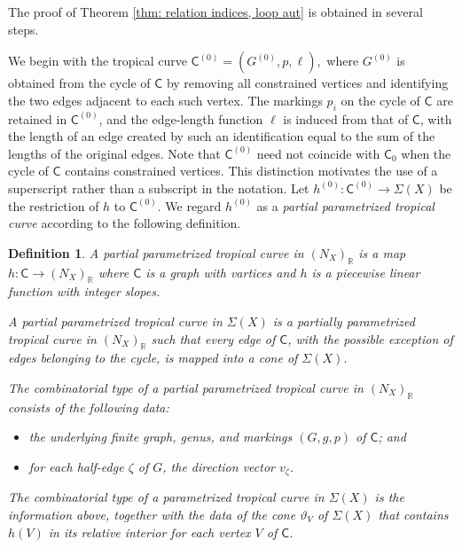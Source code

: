 \documentclass{article}
\newtheorem{definition}{Definition}[section]
\newcommand{\tropC}{\mathsf{C}}
\begin{document}
The proof of Theorem \ref{thm: relation indices, loop aut} is obtained in several steps. 

We begin with the tropical curve
$
\tropC^{(0)}=(G^{(0)},p,\ell),
$
where $G^{(0)}$ is obtained from the cycle of $\mathsf{C}$ by removing all constrained vertices and identifying the two edges adjacent to each such vertex. The markings $p_i$ on the cycle of $\mathsf{C}$ are retained in $\tropC^{(0)}$, and the edge-length function $\ell$ is induced from that of $\mathsf{C}$, with the length of an edge created by such an identification equal to the sum of the lengths of the original edges. Note that $\tropC^{(0)}$ need not coincide with $\tropC_0$ when the cycle of $\tropC$ contains constrained vertices. This distinction motivates the use of a superscript rather than a subscript in the notation. Let $h^{(0)}: \tropC^{(0)} \to \Sigma(X)$ be the restriction of $h$ to $\tropC^{(0)}$. We regard $h^{(0)}$ as a \emph{partial parametrized tropical curve} according to the following definition.

\begin{definition}
    A partial parametrized tropical curve in $(N_X)_{\mathbb{R}}$ is a map $h: \tropC \to (N_X)_\mathbb{R}$ where $\tropC$ is a graph with vartices and $h$ is a piecewise linear function with integer slopes. 

    A partial parametrized tropical curve in $\Sigma(X)$ is a partially parametrized tropical curve in $(N_X)_{\mathbb{R}}$ such that every edge of $\tropC$, with the possible exception of edges belonging to the cycle, is mapped into a cone of $\Sigma(X)$.

    The combinatorial type of a partial parametrized tropical curve in $(N_X)_{\mathbb{R}}$ consists of the following data: 
    \begin{itemize}
        \item the underlying finite graph, genus, and markings $(G,g,p)$ of $\tropC$; and
        \item for each half-edge $\zeta$ of $G$, the direction vector $v_{\zeta}$. 
    \end{itemize}

    The combinatorial type of a parametrized tropical curve in $\Sigma(X)$ is the information above, together with the data of the cone $\vartheta_V$ of $\Sigma(X)$ that contains $h(V)$ in its relative interior for each vertex $V$ of $\tropC$. 
\end{definition}
\end{document}
